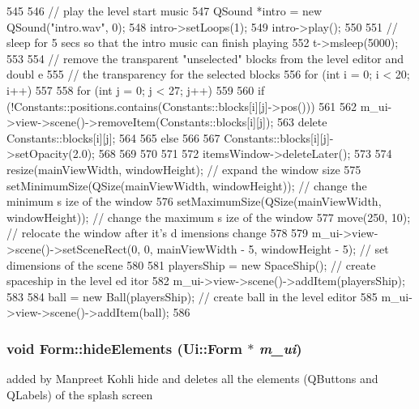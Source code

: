 \begin{DoxyCode}
545 {
546     // play the level start music
547     QSound *intro = new QSound("intro.wav", 0);
548     intro->setLoops(1);
549     intro->play();
550 
551     // sleep for 5 secs so that the intro music can finish playing
552     t->msleep(5000);
553 
554     // remove the transparent "unselected" blocks from the level editor and doubl
      e
555     // the transparency for the selected blocks
556     for (int i = 0; i < 20; i++)
557     {
558         for (int j = 0; j < 27; j++)
559         {
560             if (!Constants::positions.contains(Constants::blocks[i][j]->pos()))
561             {
562                 m_ui->view->scene()->removeItem(Constants::blocks[i][j]);
563                 delete Constants::blocks[i][j];
564             }
565             else
566             {
567                 Constants::blocks[i][j]->setOpacity(2.0);
568             }
569         }
570     }
571 
572     itemsWindow->deleteLater();
573 
574     resize(mainViewWidth, windowHeight);      // expand the window size
575     setMinimumSize(QSize(mainViewWidth, windowHeight));   // change the minimum s
      ize of the window
576     setMaximumSize(QSize(mainViewWidth, windowHeight));   // change the maximum s
      ize of the window
577     move(250, 10);                            // relocate the window after it's d
      imensions change
578 
579     m_ui->view->scene()->setSceneRect(0, 0, mainViewWidth - 5, windowHeight - 5);
             // set dimensions of the scene
580 
581     playersShip = new SpaceShip();            // create spaceship in the level ed
      itor
582     m_ui->view->scene()->addItem(playersShip);
583 
584     ball = new Ball(playersShip);             // create ball in the level editor
585     m_ui->view->scene()->addItem(ball);
586 }
\end{DoxyCode}
\hypertarget{class_form_ad6c4fa1f020d41dfbd8cda84c1d00ecb}{
\subsubsection[{hideElements}]{\setlength{\rightskip}{0pt plus 5cm}void Form::hideElements ({\bf Ui::Form} $\ast$ {\em m\_\-ui})}}
\label{class_form_ad6c4fa1f020d41dfbd8cda84c1d00ecb}
added by Manpreet Kohli hide and deletes all the elements (QButtons and QLabels) of the splash screen 

